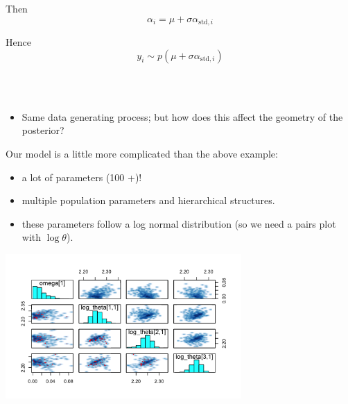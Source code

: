 \documentclass[xcolor=table]{beamer}
\begin{document}
\begin{frame}
  Then
    $$ \alpha_i = \mu + \sigma \alpha_{\mathrm{std}, i} $$
    
    Hence
      $$ y_i  \sim p(\mu + \sigma \alpha_{\mathrm{std}, i}) $$

   \ \\ \ \\
   \begin{itemize}
     \item Same data generating process; but how does this affect the geometry
     of the posterior?
   \end{itemize}

\end{frame}

\begin{frame}
  Our model is a little more complicated than the above example:
  \begin{itemize}
    \item a lot of parameters (100 +)!
    \item multiple population parameters and hierarchical structures.
    \item these parameters follow a log normal distribution (so we need
    a pairs plot with $\log \theta$).
  \end{itemize}

\end{frame}

\begin{frame}  
  \begin{center}
    \includegraphics[width=9cm]{../figures/twoCptPairs1}
  \end{center}
\end{frame}

\end{document}
